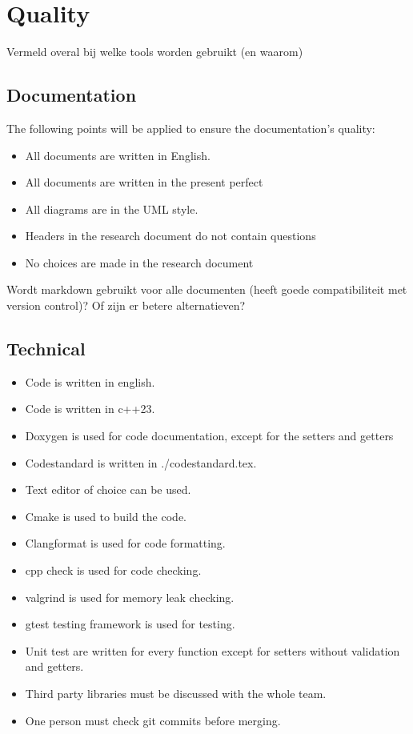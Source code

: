 \documentclass{article} %
\begin{document}
    \section{Quality}
    Vermeld overal bij welke tools worden gebruikt (en waarom)
    \subsection{Documentation}
    The following points will be applied to ensure the documentation’s quality:
    \begin{itemize}
        \item All documents are written in English.
        \item All documents are written in the present perfect
        \item All diagrams are in the UML style.
        \item Headers in the research document do not contain questions
        \item No choices are made in the research document
    \end{itemize}
    Wordt markdown gebruikt voor alle documenten (heeft goede compatibiliteit met version control)? Of zijn er betere alternatieven?
    \subsection{Technical}
    \begin{itemize}
        \item Code is written in english.
        \item Code is written in c++23.
        \item Doxygen is used for code documentation, except for the setters and getters
        \item Codestandard is written in ./codestandard.tex.
        \item Text editor of choice can be used.
        \item Cmake is used to build the code.
        \item Clangformat is used for code formatting.
        \item cpp check is used for code checking.
        \item valgrind is used for memory leak checking.
        \item gtest testing framework is used for testing.
        \item Unit test are written for every function except for setters without validation and getters.
        \item Third party libraries must be discussed with the whole team.
        \item One person must check git commits before merging.
    \end{itemize}
\end{document}
